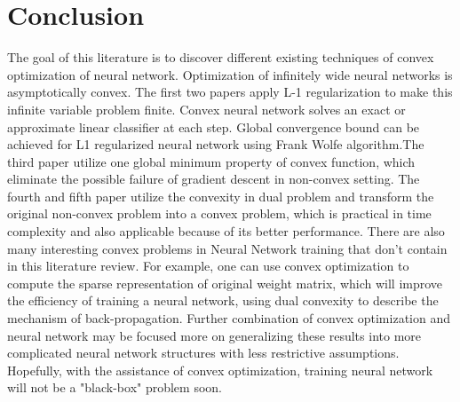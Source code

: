 \documentclass{article}
\begin{document}
\section{Conclusion}
The goal of this literature is to discover different existing techniques of convex optimization of neural network. Optimization of infinitely wide neural networks is asymptotically convex. The first two papers apply L-1 regularization to make this infinite variable problem finite. Convex neural network solves an exact or approximate linear classifier at each step. Global convergence bound can be achieved for L1 regularized neural network using Frank Wolfe algorithm.The third paper utilize one global minimum property of convex function, which eliminate the possible failure of gradient descent in non-convex setting. The fourth and fifth paper utilize the convexity in dual problem and transform the original non-convex problem into a convex problem, which is practical in time complexity and also applicable because of its better performance. There are also many interesting convex problems in Neural Network training that don't contain in this literature review. For example, one can use convex optimization to compute the sparse representation of original weight matrix, which will improve the efficiency of training a neural network, using dual convexity to describe the mechanism of back-propagation. Further combination of convex optimization and neural network may be focused more on generalizing these results into more complicated neural network structures with less restrictive assumptions. Hopefully, with the assistance of convex optimization, training neural network will not be a "black-box" problem soon.

\nocite{langley00}






\end{document}
